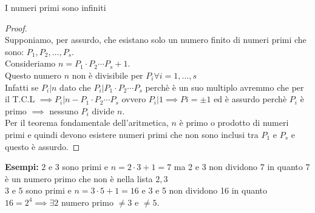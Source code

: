 \documentclass[12pt, letterpaper]{report}
\newcounter{theorem}
\begin{document}
		\begin{theorem}{}{}
			I numeri primi sono infiniti
			\begin{proof} \quad \\
				Supponiamo, per assurdo, che esistano solo un numero finito di numeri primi che sono: $P_1, P_2, \dots, P_s$. \\
				Consideriamo $n = P_1 \cdot P_2 \cdots P_s + 1$. \\
				Questo numero $n$ non è divisibile per $P_i \forall i = 1, \dots, s$ \\
				Infatti se $P_i | n$ dato che $P_i | P_1 \cdot P_2 \cdots P_s$ perchè è un suo multiplo avremmo che per il T.C.L $\implies P_i | n - P_1 \cdot P_2 \cdots P_s$ ovvero $P_i | 1 \implies Pi= \pm 1$ ed è assurdo perchè $P_i$ è primo $\implies$ nessuno $P_i$ divide $n$. \\
				Per il teorema fondamentale dell'aritmetica, $n$ è primo o prodotto di numeri primi e quindi devono esistere numeri primi che non sono inclusi tra $P_1$ e $P_s$ e questo è assurdo.
			\end{proof}
		\end{theorem}
		\textbf{Esempi:} $2$ e $3$ sono primi e $n = 2 \cdot 3 + 1 = 7$ ma 2 e 3 non dividono 7 in quanto 7 è un numero primo che non è nella lista $2,3$ \\
		$3$ e $5$ sono primi e $n = 3 \cdot 5 + 1 = 16$ e 3 e 5 non dividono 16 in quanto $16 = 2^4 \implies \exists 2$ numero primo $\neq 3$ e $\neq 5$. \\
\end{document}
